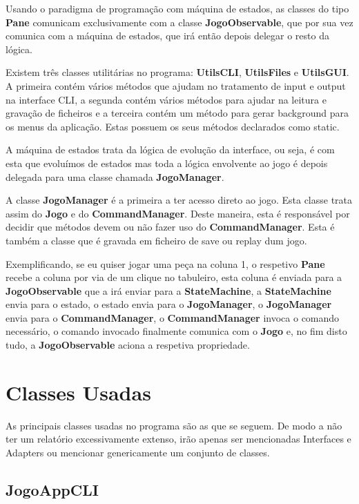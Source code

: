 \documentclass[11pt]{article}
\begin{document}
	Usando o paradigma de programação com máquina de estados, as classes do tipo \textbf{Pane} comunicam exclusivamente com a classe \textbf{JogoObservable}, que por sua vez comunica com a máquina de estados, que irá então depois delegar o resto da lógica.
	
	Existem três classes utilitárias no programa: \textbf{UtilsCLI}, \textbf{UtilsFiles} e \textbf{UtilsGUI}. A primeira contém vários métodos que ajudam no tratamento de input e output na interface CLI, a segunda contém vários métodos para ajudar na leitura e gravação de ficheiros e a terceira contém um método para gerar background para os menus da aplicação. Estas possuem os seus métodos declarados como static.
	
	A máquina de estados trata da lógica de evolução da interface, ou seja, é com esta que evoluímos de estados mas toda a lógica envolvente ao jogo é depois delegada para uma classe chamada \textbf{JogoManager}.
	
	A classe \textbf{JogoManager} é a primeira a ter acesso direto ao jogo. Esta classe trata assim do \textbf{Jogo} e do \textbf{CommandManager}. Deste maneira, esta é responsável por decidir que métodos devem ou não fazer uso do \textbf{CommandManager}. Esta é também a classe que é gravada em ficheiro de save ou replay dum jogo.
	
	Exemplificando, se eu quiser jogar uma peça na coluna 1, o respetivo \textbf{Pane} recebe a coluna por via de um clique no tabuleiro, esta coluna é enviada para a \textbf{JogoObservable} que a irá enviar para a \textbf{StateMachine}, a \textbf{StateMachine} envia para o estado, o estado envia para o \textbf{JogoManager}, o \textbf{JogoManager} envia para o \textbf{CommandManager}, o \textbf{CommandManager} invoca o comando necessário, o comando invocado finalmente comunica com o \textbf{Jogo} e, no fim disto tudo, a \textbf{JogoObservable} aciona a respetiva propriedade.
	
	
	\large
	\section{Classes Usadas}
	\normalsize
	
	As principais classes usadas no programa são as que se seguem. De modo a não ter um relatório excessivamente extenso, irão apenas ser mencionadas Interfaces e Adapters ou mencionar genericamente um conjunto de classes.
	
	\large
	\subsection{JogoAppCLI}
	\normalsize
\end{document}
